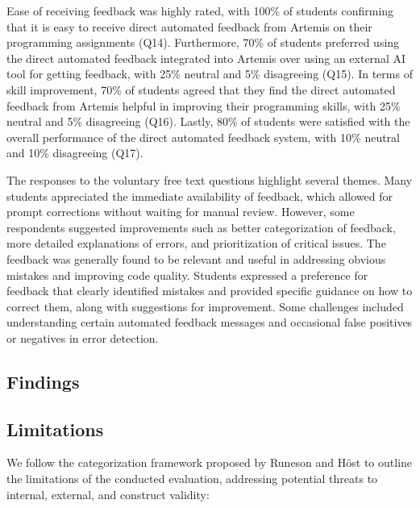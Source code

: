\documentclass[manuscript,screen,review]{acmart}
\begin{document}
Ease of receiving feedback was highly rated, with 100\% of students confirming that it is easy to receive direct automated feedback from Artemis on their programming assignments (Q14).
Furthermore, 70\% of students preferred using the direct automated feedback integrated into Artemis over using an external AI tool for getting feedback, with 25\% neutral and 5\% disagreeing (Q15).
In terms of skill improvement, 70\% of students agreed that they find the direct automated feedback from Artemis helpful in improving their programming skills, with 25\% neutral and 5\% disagreeing (Q16).
Lastly, 80\% of students were satisfied with the overall performance of the direct automated feedback system, with 10\% neutral and 10\% disagreeing (Q17).


The responses to the voluntary free text questions highlight several themes.
Many students appreciated the immediate availability of feedback, which allowed for prompt corrections without waiting for manual review. 
However, some respondents suggested improvements such as better categorization of feedback, more detailed explanations of errors, and prioritization of critical issues. 
The feedback was generally found to be relevant and useful in addressing obvious mistakes and improving code quality. 
Students expressed a preference for feedback that clearly identified mistakes and provided specific guidance on how to correct them, along with suggestions for improvement. 
Some challenges included understanding certain automated feedback messages and occasional false positives or negatives in error detection.


\subsection{Findings}


\subsection{Limitations}
We follow the categorization framework proposed by Runeson and Höst \cite{runeson:2009:GuidelinesConductingReporting} to outline the limitations of the conducted evaluation, addressing potential threats to internal, external, and construct validity:

\end{document}
